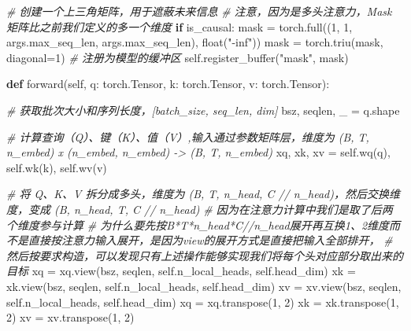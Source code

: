 \documentclass[
]{article}
\newenvironment{Shaded}{}{}
\newcommand{\BuiltInTok}[1]{\textcolor[rgb]{0.00,0.50,0.00}{#1}}
\newcommand{\CommentTok}[1]{\textcolor[rgb]{0.38,0.63,0.69}{\textit{#1}}}
\newcommand{\ControlFlowTok}[1]{\textcolor[rgb]{0.00,0.44,0.13}{\textbf{#1}}}
\newcommand{\DecValTok}[1]{\textcolor[rgb]{0.25,0.63,0.44}{#1}}
\newcommand{\KeywordTok}[1]{\textcolor[rgb]{0.00,0.44,0.13}{\textbf{#1}}}
\newcommand{\NormalTok}[1]{#1}
\newcommand{\OperatorTok}[1]{\textcolor[rgb]{0.40,0.40,0.40}{#1}}
\newcommand{\StringTok}[1]{\textcolor[rgb]{0.25,0.44,0.63}{#1}}
\newcommand{\VariableTok}[1]{\textcolor[rgb]{0.10,0.09,0.49}{#1}}
\begin{document}
\begin{Shaded}
\begin{Highlighting}[]
        \CommentTok{\# 创建一个上三角矩阵，用于遮蔽未来信息}
        \CommentTok{\# 注意，因为是多头注意力，Mask 矩阵比之前我们定义的多一个维度}
        \ControlFlowTok{if}\NormalTok{ is\_causal:}
\NormalTok{           mask }\OperatorTok{=}\NormalTok{ torch.full((}\DecValTok{1}\NormalTok{, }\DecValTok{1}\NormalTok{, args.max\_seq\_len, args.max\_seq\_len), }\BuiltInTok{float}\NormalTok{(}\StringTok{"{-}inf"}\NormalTok{))}
\NormalTok{           mask }\OperatorTok{=}\NormalTok{ torch.triu(mask, diagonal}\OperatorTok{=}\DecValTok{1}\NormalTok{)}
           \CommentTok{\# 注册为模型的缓冲区}
           \VariableTok{self}\NormalTok{.register\_buffer(}\StringTok{"mask"}\NormalTok{, mask)}

    \KeywordTok{def}\NormalTok{ forward(}\VariableTok{self}\NormalTok{, q: torch.Tensor, k: torch.Tensor, v: torch.Tensor):}

        \CommentTok{\# 获取批次大小和序列长度，[batch\_size, seq\_len, dim]}
\NormalTok{        bsz, seqlen, \_ }\OperatorTok{=}\NormalTok{ q.shape}

        \CommentTok{\# 计算查询（Q）、键（K）、值（V）,输入通过参数矩阵层，维度为 (B, T, n\_embed) x (n\_embed, n\_embed) {-}\textgreater{} (B, T, n\_embed)}
\NormalTok{        xq, xk, xv }\OperatorTok{=} \VariableTok{self}\NormalTok{.wq(q), }\VariableTok{self}\NormalTok{.wk(k), }\VariableTok{self}\NormalTok{.wv(v)}

        \CommentTok{\# 将 Q、K、V 拆分成多头，维度为 (B, T, n\_head, C // n\_head)，然后交换维度，变成 (B, n\_head, T, C // n\_head)}
        \CommentTok{\# 因为在注意力计算中我们是取了后两个维度参与计算}
        \CommentTok{\# 为什么要先按B*T*n\_head*C//n\_head展开再互换1、2维度而不是直接按注意力输入展开，是因为view的展开方式是直接把输入全部排开，}
        \CommentTok{\# 然后按要求构造，可以发现只有上述操作能够实现我们将每个头对应部分取出来的目标}
\NormalTok{        xq }\OperatorTok{=}\NormalTok{ xq.view(bsz, seqlen, }\VariableTok{self}\NormalTok{.n\_local\_heads, }\VariableTok{self}\NormalTok{.head\_dim)}
\NormalTok{        xk }\OperatorTok{=}\NormalTok{ xk.view(bsz, seqlen, }\VariableTok{self}\NormalTok{.n\_local\_heads, }\VariableTok{self}\NormalTok{.head\_dim)}
\NormalTok{        xv }\OperatorTok{=}\NormalTok{ xv.view(bsz, seqlen, }\VariableTok{self}\NormalTok{.n\_local\_heads, }\VariableTok{self}\NormalTok{.head\_dim)}
\NormalTok{        xq }\OperatorTok{=}\NormalTok{ xq.transpose(}\DecValTok{1}\NormalTok{, }\DecValTok{2}\NormalTok{)}
\NormalTok{        xk }\OperatorTok{=}\NormalTok{ xk.transpose(}\DecValTok{1}\NormalTok{, }\DecValTok{2}\NormalTok{)}
\NormalTok{        xv }\OperatorTok{=}\NormalTok{ xv.transpose(}\DecValTok{1}\NormalTok{, }\DecValTok{2}\NormalTok{)}



\end{Highlighting}
\end{Shaded}
\end{document}
